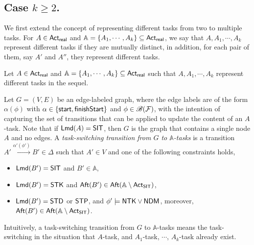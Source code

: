 \subsection*{Case $k \ge 2$.}

We first extend the concept of representing different tasks from two to multiple tasks.
For $A \in {\sf Act}_{\sf real}$ and $\mathbb{A} = \{A_1, \cdots, A_k\} \subseteq {\sf Act}_{\sf real}$, we say that $A, A_1, \cdots, A_k$ represent different tasks if they are mutually distinct, in addition, for each pair of them, say $A'$ and $A''$, they represent different tasks.  

Let $A \in {\sf Act}_{\sf real}$ and $\mathbb{A} = \{A_1, \cdots, A_k\} \subseteq {\sf Act}_{\sf real}$ such that $A, A_1, \cdots, A_k$ represent different tasks in the sequel.

Let $G=(V, E)$ be an edge-labeled graph,  where the edge labels are of the form $\alpha(\phi)$ with $\alpha \in \{{\mathsf{start} }, {\mathsf{finishStart} }\}$ and $\phi \in \mathscr{B}({\mathcal{F} })$, with the intention of capturing the set of transitions that can be applied to update the content of an $A$-task. Note that if ${\sf Lmd}(A) = {\sf SIT}$, then $G$ is the graph that contains a single node $A$ and no edges.
A \emph{task-switching transition from $G$ to $\mathbb{A}$-tasks} is a transition $A' \xrightarrow{\alpha'(\phi')} B' \in \Delta$ such that $A' \in V$ and one of the following constraints holds,
%
%
\begin{itemize}
\item ${\sf Lmd}(B') = {\sf SIT}$ and $B' \in \mathbb{A}$, 
%
\item ${\sf Lmd}(B') = {\sf STK}$ and ${\sf Aft}(B') \in {\sf Aft}(\mathbb{A} \setminus {\sf Act}_{\sf SIT})$, 
%
\item  ${\sf Lmd}(B') = {\sf STD}$ or ${\sf STP}$, and $\phi' \models {\sf NTK}\vee{\sf NDM}$,  moreover, ${\sf Aft}(B') \in {\sf Aft}(\mathbb{A} \setminus {\sf Act}_{\sf SIT})$.
\end{itemize}
Intuitively, a task-switching transition from $G$ to  $\mathbb{A}$-tasks means the task-switching in the situation that $A$-task, and $A_1$-task, $\cdots$, $A_k$-task already exist. 


